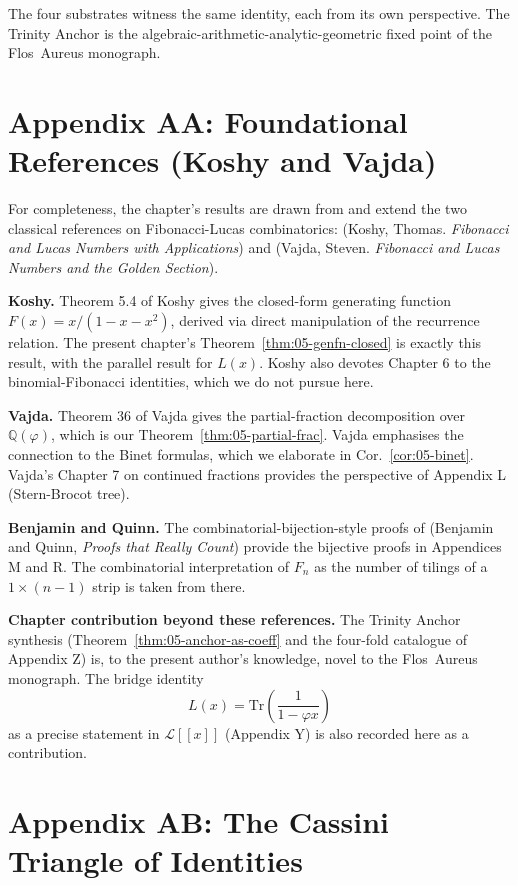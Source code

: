 The four substrates witness the same identity, each from its own
perspective. The Trinity Anchor is the algebraic-arithmetic-analytic-geometric
fixed point of the Flos~Aureus monograph.

\section*{Appendix AA: Foundational References (Koshy and Vajda)}
\label{sec:05-app-AA}

For completeness, the chapter's results are drawn from and extend the
two classical references on Fibonacci-Lucas combinatorics:
\cite{koshy_fib_lucas} (Koshy, Thomas. \emph{Fibonacci and Lucas
Numbers with Applications}) and \cite{vajda_fib_lucas} (Vajda,
Steven. \emph{Fibonacci and Lucas Numbers and the Golden Section}).

\textbf{Koshy.} Theorem 5.4 of Koshy gives the closed-form generating
function $F(x) = x/(1-x-x^2)$, derived via direct manipulation of the
recurrence relation. The present chapter's Theorem~\ref{thm:05-genfn-closed}
is exactly this result, with the parallel result for $L(x)$. Koshy
also devotes Chapter 6 to the binomial-Fibonacci identities, which we
do not pursue here.

\textbf{Vajda.} Theorem 36 of Vajda gives the partial-fraction
decomposition over $\mathbb{Q}(\varphi)$, which is our
Theorem~\ref{thm:05-partial-frac}. Vajda emphasises the connection to
the Binet formulas, which we elaborate in Cor.~\ref{cor:05-binet}.
Vajda's Chapter 7 on continued fractions provides the perspective of
Appendix L (Stern-Brocot tree).

\textbf{Benjamin and Quinn.} The combinatorial-bijection-style proofs
of \cite{benjamin_quinn_proofs} (Benjamin and Quinn,
\emph{Proofs that Really Count}) provide the bijective proofs in
Appendices M and R. The combinatorial interpretation of $F_n$ as
the number of tilings of a $1 \times (n-1)$ strip is taken from there.

\textbf{Chapter contribution beyond these references.} The Trinity
Anchor synthesis (Theorem~\ref{thm:05-anchor-as-coeff} and the four-fold
catalogue of Appendix Z) is, to the present author's knowledge, novel
to the Flos~Aureus monograph. The bridge identity
\[
  L(x) = \mathrm{Tr}\left(\frac{1}{1 - \varphi x}\right)
\]
as a precise statement in $\mathcal{L}[[x]]$ (Appendix Y) is also
recorded here as a contribution.

\section*{Appendix AB: The Cassini Triangle of Identities}
\label{sec:05-app-AB}


